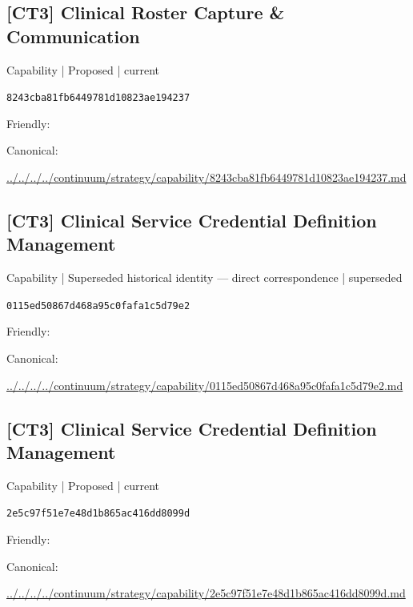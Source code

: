 \documentclass[10pt,a4paper]{article}
\begin{document}
\subsection*{[CT3] Clinical Roster Capture \& Communication}
{\small Capability | Proposed | current}\par
\texttt{8243cba81fb6449781d10823ae194237}\par
Friendly: \par
Canonical: \par
{\footnotesize\url{../../../../continuum/strategy/capability/8243cba81fb6449781d10823ae194237.md}}\par
\subsection*{[CT3] Clinical Service Credential Definition Management}
{\small Capability | Superseded historical identity — direct correspondence | superseded}\par
\texttt{0115ed50867d468a95c0fafa1c5d79e2}\par
Friendly: \par
Canonical: \par
{\footnotesize\url{../../../../continuum/strategy/capability/0115ed50867d468a95c0fafa1c5d79e2.md}}\par
\subsection*{[CT3] Clinical Service Credential Definition Management}
{\small Capability | Proposed | current}\par
\texttt{2e5c97f51e7e48d1b865ac416dd8099d}\par
Friendly: \par
Canonical: \par
{\footnotesize\url{../../../../continuum/strategy/capability/2e5c97f51e7e48d1b865ac416dd8099d.md}}\par
\end{document}
